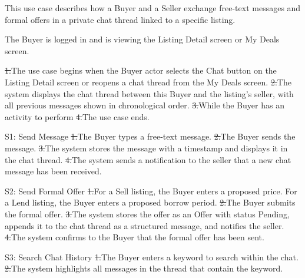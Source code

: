 This use case describes how a Buyer and a Seller exchange free-text messages and formal offers in a private chat thread linked to a specific listing.\par
{}
The Buyer is logged in and is viewing the Listing Detail screen or My Deals screen.\par
{}
\st{1.}{The use case begins when the Buyer actor selects the Chat button on the Listing Detail screen or reopens a chat thread from the My Deals screen.}
\st{2.}{The system displays the chat thread between this Buyer and the listing's seller, with all previous messages shown in chronological order.}
\st{3.}{While the Buyer has an activity to perform}
\st{4.}{The use case ends.}
\begin{flowblock}{S1: Send Message}
\st{1.}{The Buyer types a free-text message.}
\st{2.}{The Buyer sends the message.}
\st{3.}{The system stores the message with a timestamp and displays it in the chat thread.}
\st{4.}{The system sends a notification to the seller that a new chat message has been received.}
\end{flowblock}
\begin{flowblock}{S2: Send Formal Offer}
\st{1.}{For a Sell listing, the Buyer enters a proposed price. For a Lend listing, the Buyer enters a proposed borrow period.}
\st{2.}{The Buyer submits the formal offer.}
\st{3.}{The system stores the offer as an Offer with status Pending, appends it to the chat thread as a structured message, and notifies the seller.}
\st{4.}{The system confirms to the Buyer that the formal offer has been sent.}
\end{flowblock}
\begin{flowblock}{S3: Search Chat History}
\st{1.}{The Buyer enters a keyword to search within the chat.}
\st{2.}{The system highlights all messages in the thread that contain the keyword.}
\end{flowblock}
